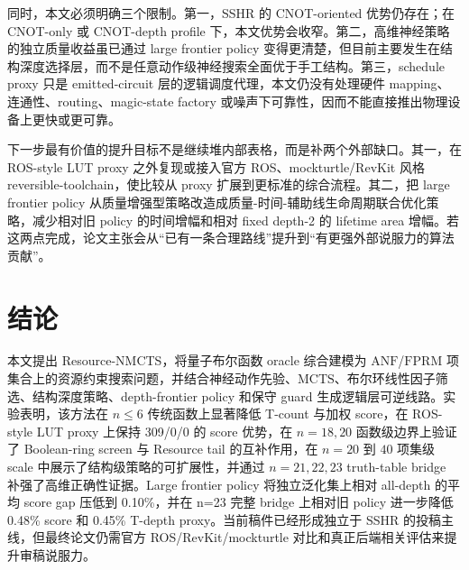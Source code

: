 \documentclass[UTF8,fontset=macnew,11pt]{ctexart}
\newcommand{\method}{Resource-NMCTS}
\newcommand{\screen}{Boolean-ring screen}
\newcommand{\anf}{\ensuremath{\mathrm{ANF}}}
\newcommand{\fprm}{\ensuremath{\mathrm{FPRM}}}
\newcommand{\mcts}{\ensuremath{\mathrm{MCTS}}}
\begin{document}
同时，本文必须明确三个限制。第一，SSHR 的 CNOT-oriented 优势仍存在；在 CNOT-only 或 CNOT-depth profile 下，本文优势会收窄。第二，高维神经策略的独立质量收益虽已通过 large frontier policy 变得更清楚，但目前主要发生在结构深度选择层，而不是任意动作级神经搜索全面优于手工结构。第三，schedule proxy 只是 emitted-circuit 层的逻辑调度代理，本文仍没有处理硬件 mapping、连通性、routing、magic-state factory 或噪声下可靠性，因而不能直接推出物理设备上更快或更可靠。

下一步最有价值的提升目标不是继续堆内部表格，而是补两个外部缺口。其一，在 ROS-style LUT proxy 之外复现或接入官方 ROS、mockturtle/RevKit 风格 reversible-toolchain，使比较从 proxy 扩展到更标准的综合流程。其二，把 large frontier policy 从质量增强型策略改造成质量-时间-辅助线生命周期联合优化策略，减少相对旧 policy 的时间增幅和相对 fixed depth-2 的 lifetime area 增幅。若这两点完成，论文主张会从“已有一条合理路线”提升到“有更强外部说服力的算法贡献”。

\section{结论}

本文提出 \method{}，将量子布尔函数 oracle 综合建模为 \anf{}/\fprm{} 项集合上的资源约束搜索问题，并结合神经动作先验、\mcts{}、布尔环线性因子筛选、结构深度策略、depth-frontier policy 和保守 guard 生成逻辑层可逆线路。实验表明，该方法在 $n\leq6$ 传统函数上显著降低 T-count 与加权 score，在 ROS-style LUT proxy 上保持 309/0/0 的 score 优势，在 $n=18,20$ 函数级边界上验证了 \screen{} 与 Resource tail 的互补作用，在 $n=20$ 到 $40$ 项集级 scale 中展示了结构级策略的可扩展性，并通过 $n=21,22,23$ truth-table bridge 补强了高维正确性证据。Large frontier policy 将独立泛化集上相对 all-depth 的平均 score gap 压低到 0.10\%，并在 n=23 完整 bridge 上相对旧 policy 进一步降低 0.48\% score 和 0.45\% T-depth proxy。当前稿件已经形成独立于 SSHR 的投稿主线，但最终论文仍需官方 ROS/RevKit/mockturtle 对比和真正后端相关评估来提升审稿说服力。
\end{document}
